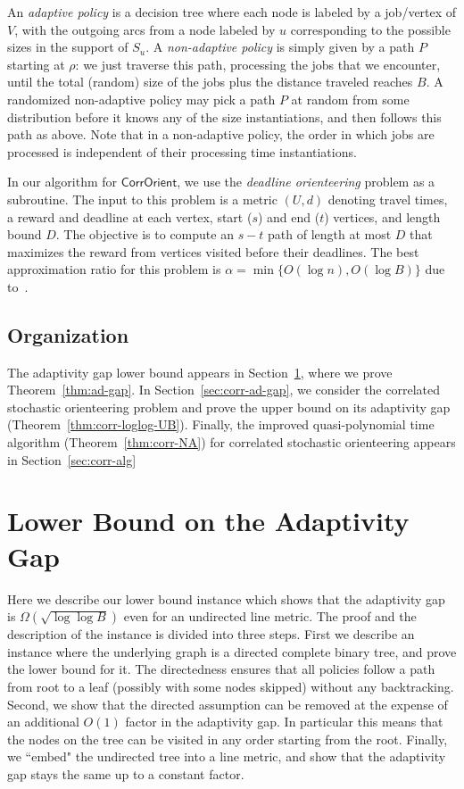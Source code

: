 \documentclass[11pt,letterpaper]{article}
\numberwithin{algorithm}{section}
\newcommand{\co}{\ensuremath{\mathsf{CorrOrient}}\xspace}
\begin{document}
An \emph{adaptive policy} is a decision tree where each node is labeled by a job/vertex of $V$, with the outgoing arcs
from a node labeled by $u$ corresponding to the possible sizes in the support of $S_u$.  A \emph{non-adaptive
policy} is simply given by a path $P$ starting at $\rho$: we just traverse this path, processing
the jobs that we encounter, until the total (random) size of the jobs plus the distance traveled reaches $B$. A
randomized non-adaptive policy may pick a path $P$ at random from some distribution before it knows any of the
size instantiations, and then follows this path as above. Note that in a non-adaptive policy, the order in which jobs
are processed is independent of their processing time instantiations.





In our algorithm for \co, we use the {\em deadline orienteering} problem as a subroutine.
The input to this problem is a metric $(U,d)$ denoting travel times, a reward and deadline at each vertex, start ($s$) and end ($t$) vertices, and length bound $D$. The objective is to compute an $s-t$ path of length at most $D$ that maximizes the reward from vertices visited before their deadlines.
The best approximation ratio for this problem is $\alpha=\min\{O(\log n), O(\log B)\}$  due to~\cite{BBCM04,CKP08}.


\subsection{Organization}
The adaptivity gap lower bound appears in Section~\ref{sec:ad-gap}, where we prove Theorem~\ref{thm:ad-gap}. In Section~\ref{sec:corr-ad-gap}, we consider the correlated stochastic orienteering problem and prove the upper bound on its adaptivity gap (Theorem~\ref{thm:corr-loglog-UB}). Finally, the improved quasi-polynomial time algorithm (Theorem~\ref{thm:corr-NA}) for correlated stochastic orienteering appears in Section~\ref{sec:corr-alg}

\section{Lower Bound on the Adaptivity Gap}\label{sec:ad-gap}
Here we describe our lower bound instance which shows that the adaptivity gap is $\Omega(\sqrt{\log \log B})$ even for an undirected line metric. The proof and the description of the instance is divided into three steps. First we describe an instance where the underlying graph is a directed complete binary tree, and prove the lower bound for it. The directedness ensures that all policies follow a path from root to a leaf (possibly with some nodes skipped) without any backtracking. Second, we show that the directed assumption can be removed at the expense of an additional $O(1)$ factor in the adaptivity gap. In particular this means that the nodes on the tree can be visited in any order starting from the root. Finally, we ``embed" the undirected tree into a line metric, and show that the adaptivity gap stays the same up to a constant factor.
\end{document}
